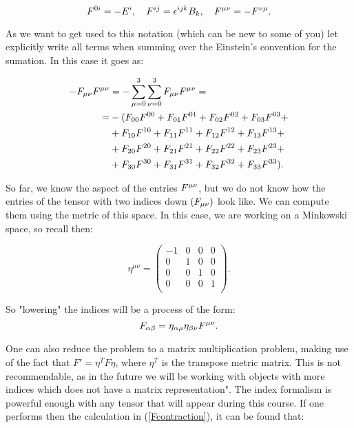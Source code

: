 \begin{equation}\label{relationsFtensor}
	F^{0 i }= -E^{i}, \quad F^{ij } = \epsilon^{ijk} B_{k}, \quad F^{\mu\nu  } =- F^{\nu\mu }.
\end{equation}

As we want to get used to this notation (which can be new to some of you) let explicitly write all terms when summing over the Einstein's convention for the sumation. In this case it goes as:

\begin{equation}\label{Fcontraction}
	\begin{split}
		- F_{\mu\nu }F^{\mu\nu } &= - \sum_{\mu =0 }^{3} \sum_{\nu =0 }^{3} F_{\mu\nu }F^{\mu\nu }=\\
		=&-(F_{00 }F^{00 } + F_{01 }F^{01 } + F_{02 }F^{02 } + F_{03 }F^{03 } +\\
		& + F_{10 }F^{10 } + F_{11 }F^{11 } + F_{12 }F^{12 } + F_{13 }F^{13 } + \\
		& + F_{20 }F^{20 } + F_{21 }F^{21 } + F_{22 }F^{22 } + F_{23 }F^{23 } +\\
		& + F_{30 }F^{30 } + F_{31 }F^{31 } + F_{32 }F^{32 } + F_{33 }F^{33 }).
	\end{split}
\end{equation}

So far, we know the aspect of the entries $F^{\mu\nu }$, but we do not know how the entries of the tensor with two indices down $(F_{\mu\nu })$ look like. We can compute them using the metric of this space. In this case, we are working on a Minkowski space, so recall then:

\begin{equation}\label{minkowski}
	\eta^{\mu\nu}= \begin{pmatrix}
		-1&0&0&0\\
		0&1&0&0\\
		0&0&1&0\\
		0&0&0&1\\
	\end{pmatrix}.
\end{equation}

So "lowering" the indices will be a process of the form:
\begin{equation}
	F_{\alpha \beta } = \eta_{\alpha \mu} \eta_{\beta \nu} F^{\mu\nu }. 
\end{equation}

One can also reduce the problem to a matrix multiplication problem, making use of the fact that $F' = \eta^{T} F \eta$, where $\eta^{T}$ is the transpose metric matrix. This is not recommendable, as in the future we will be working with objects with more indices which does not have a matrix representation". The index formalism is powerful enough with any tensor that will appear during this course. If one performs then the calculation in (\ref{Fcontraction}), it can be found that:

